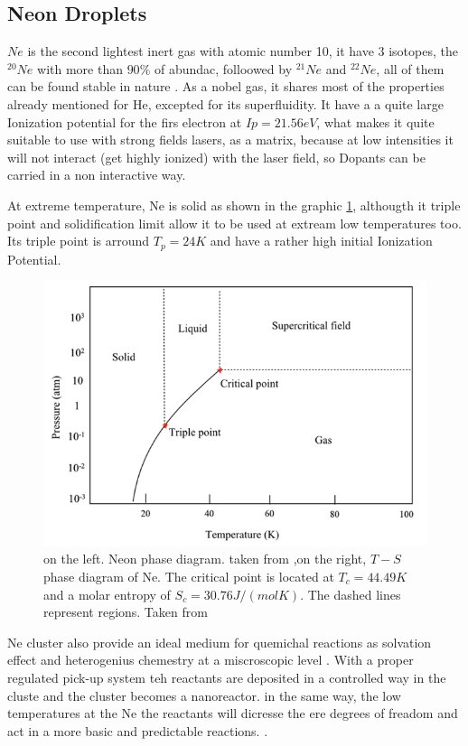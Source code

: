 \subsection{Neon Droplets}

$Ne$ is the second lightest inert gas with atomic number 10, it have 3 isotopes, the $^{20}Ne$ with more than $90\%$ of abundac, folloowed by $^{21}Ne$ and  $^{22}Ne$, all of them  can be found stable in nature \cite{meija_atomic_2016}. As a nobel gas, it shares most of the properties already mentioned for He, excepted  for its superfluidity.  It have a a quite large Ionization potential for the firs electron at $Ip=21.56 eV$, what makes it quite suitable to use with strong fields lasers, as a matrix, because at low intensities it will not interact (get highly ionized) with the laser field, so Dopants can be carried in a non interactive way.

At extreme temperature, Ne is solid as shown in the graphic \ref{img:Nephases}, althougth it triple point and solidification limit allow it to be used at extream low temperatures too. Its triple point is arround $T_{p}=24K$ \cite{young_phase_nodate} and have a rather high initial Ionization Potential. 

\begin{figure}[hbtp]\label{img:Nephases}
\centering
\includegraphics[width= 8 cm]{../Images/Ne_temp_phases.png}
\caption{on the left. Neon phase diagram. taken from \cite{young_phase_nodate},on the right, $T-S$ phase diagram of Ne. The critical point is located at $T_{c}= 44.49 K$ and a molar entropy of $S_{c}=30.76 J/(mol K)$. The dashed lines represent regions. Taken from \cite{christen_supersonic_2010-1} }
\end{figure}

Ne cluster also provide an ideal medium for quemichal reactions as solvation effect and heterogenius chemestry at a miscroscopic level \cite{gough_infrared_1985}. With a proper regulated pick-up system teh reactants are deposited in a controlled way in the cluste and the cluster becomes a nanoreactor. in the same way, the low temperatures at the Ne the reactants will dicresse the ere degrees of freadom and act in a more basic and predictable reactions. \cite{gaveau_reaction_2001}.

